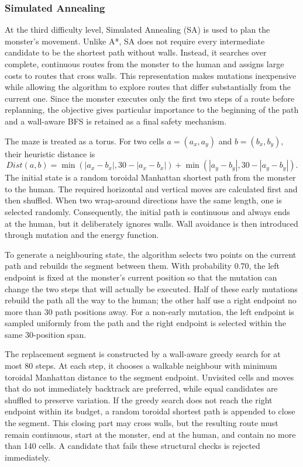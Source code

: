 \subsubsection{Simulated Annealing}

At the third difficulty level, Simulated Annealing (SA) is used to plan the
monster's movement. Unlike A*, SA does not require every intermediate
candidate to be the shortest path without walls. Instead, it searches over complete,
continuous routes from the monster to the human and assigns large costs to
routes that cross walls. This representation makes mutations inexpensive while
allowing the algorithm to explore routes that differ substantially from the
current one. Since the monster executes only the first two steps of a route
before replanning, the objective gives particular importance to the beginning
of the path and a wall-aware BFS is retained as a final safety mechanism.

The maze is treated as a torus. For two cells $a=(a_x,a_y)$ and
$b=(b_x,b_y)$, their heuristic distance is
\[
Dist(a,b)=
\min(|a_x-b_x|,30-|a_x-b_x|)
+\min(|a_y-b_y|,30-|a_y-b_y|).
\]
The initial state is a random toroidal Manhattan shortest path from the monster
to the human. The required horizontal and vertical moves are calculated first
and then shuffled. When two wrap-around directions have the same length, one is
selected randomly. Consequently, the initial path is continuous and always
ends at the human, but it deliberately ignores walls. Wall avoidance is then
introduced through mutation and the energy function.

To generate a neighbouring state, the algorithm selects two points on the
current path and rebuilds the segment between them. With probability $0.70$,
the left endpoint is fixed at the monster's current position so that the
mutation can change the two steps that will actually be executed. Half of these
early mutations rebuild the path all the way to the human; the other half use a
right endpoint no more than 30 path positions away. For a non-early mutation,
the left endpoint is sampled uniformly from the path and the right endpoint is
selected within the same 30-position span.

The replacement segment is constructed by a wall-aware greedy search for at
most 80 steps. At each step, it chooses a walkable neighbour with minimum
toroidal Manhattan distance to the segment endpoint. Unvisited cells and moves
that do not immediately backtrack are preferred, while equal candidates are
shuffled to preserve variation. If the greedy search does not reach the right
endpoint within its budget, a random toroidal shortest path is appended to
close the segment. This closing part may cross walls, but the resulting route
must remain continuous, start at the monster, end at the human, and contain no
more than 140 cells. A candidate that fails these structural checks is rejected
immediately.

